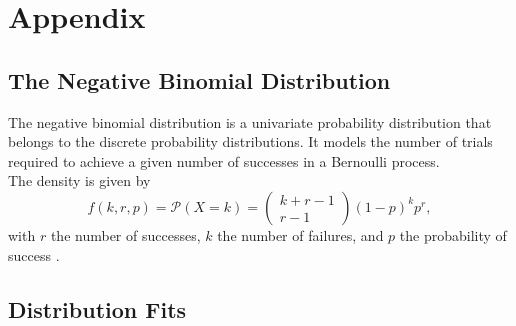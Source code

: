 %
\chapter{Appendix}
\label{sec:appendix}

\section{The Negative Binomial Distribution}
The negative binomial distribution is a univariate probability distribution that belongs to the discrete probability distributions. It models the number of trials required to achieve a given number of successes in a Bernoulli process. \\
The density is given by
\begin{equation}
    f\left(k,r,p\right)=\mathcal{P}\left(X=k\right)=\begin{pmatrix} k+r-1\\r-1\end{pmatrix}\left(1-p\right)^kp^r,
\end{equation}
with $r$ the number of successes, $k$ the number of failures, and $p$ the probability of success \cite{haldane1941fitting}.
\section{Distribution Fits}
